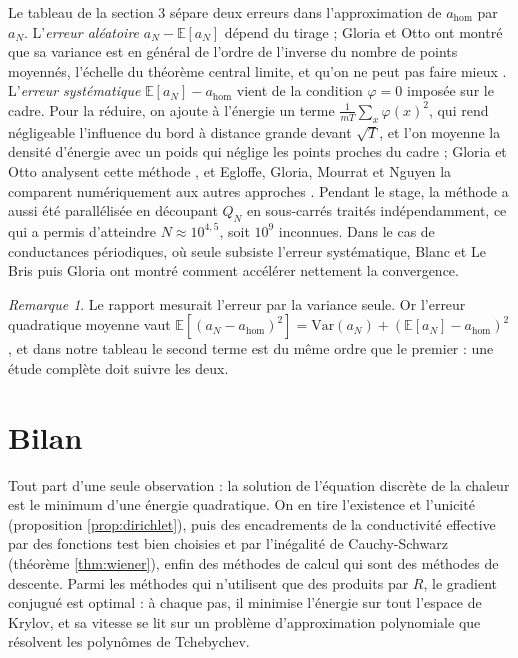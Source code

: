 \documentclass[11pt,a4paper]{article}
\theoremstyle{plain}
\theoremstyle{definition}
\theoremstyle{remark}
\newtheorem{remarque}[theoreme]{Remarque}
\begin{document}
Le tableau de la section 3 sépare deux erreurs dans l'approximation de $a_{\mathrm{hom}}$ par $a_N$. L'\emph{erreur aléatoire} $a_N-\mathbb{E}[a_N]$ dépend du tirage ; Gloria et Otto ont montré que sa variance est en général de l'ordre de l'inverse du nombre de points moyennés, l'échelle du théorème central limite, et qu'on ne peut pas faire mieux \cite{go1}. L'\emph{erreur systématique} $\mathbb{E}[a_N]-a_{\mathrm{hom}}$ vient de la condition $\varphi=0$ imposée sur le cadre. Pour la réduire, on ajoute à l'énergie un terme $\frac1{mT}\sum_x\varphi(x)^2$, qui rend négligeable l'influence du bord à distance grande devant $\sqrt T$, et l'on moyenne la densité d'énergie avec un poids qui néglige les points proches du cadre ; Gloria et Otto analysent cette méthode \cite{go2}, et Egloffe, Gloria, Mourrat et Nguyen la comparent numériquement aux autres approches \cite{egmn}. Pendant le stage, la méthode a aussi été parallélisée en découpant $Q_N$ en sous-carrés traités indépendamment, ce qui a permis d'atteindre $N\approx10^{4,5}$, soit $10^9$ inconnues. Dans le cas de conductances périodiques, où seule subsiste l'erreur systématique, Blanc et Le Bris \cite{blb} puis Gloria \cite{gloria} ont montré comment accélérer nettement la convergence.

\begin{remarque}
Le rapport mesurait l'erreur par la variance seule. Or l'erreur quadratique moyenne vaut $\mathbb{E}[(a_N-a_{\mathrm{hom}})^2]=\mathrm{Var}(a_N)+(\mathbb{E}[a_N]-a_{\mathrm{hom}})^2$, et dans notre tableau le second terme est du même ordre que le premier : une étude complète doit suivre les deux.
\end{remarque}

\section{Bilan}

Tout part d'une seule observation : la solution de l'équation discrète de la chaleur est le minimum d'une énergie quadratique. On en tire l'existence et l'unicité (proposition \ref{prop:dirichlet}), puis des encadrements de la conductivité effective par des fonctions test bien choisies et par l'inégalité de Cauchy-Schwarz (théorème \ref{thm:wiener}), enfin des méthodes de calcul qui sont des méthodes de descente. Parmi les méthodes qui n'utilisent que des produits par $R$, le gradient conjugué est optimal : à chaque pas, il minimise l'énergie sur tout l'espace de Krylov, et sa vitesse se lit sur un problème d'approximation polynomiale que résolvent les polynômes de Tchebychev.
\end{document}
